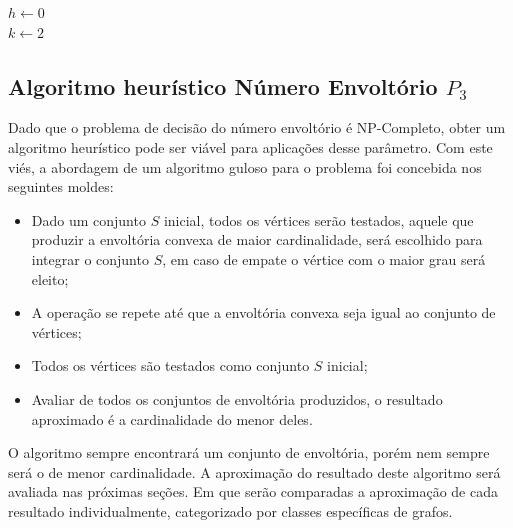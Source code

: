 
\begin{algorithm2e}
    \SetAlFnt{\tiny}
    \SetAlCapFnt{\small}
    \SetAlCapNameFnt{\small}
    \SetAlgoLined
    \DontPrintSemicolon
    \LinesNumbered
    \SetAlgoLined
    \BlankLine
    \BlankLine
    $h \gets 0$\\
    $k \gets 2$\\
\caption{$NumeroEnvoltorio(G(V,E))$}
\label{alg:numero-envoltoria-p3}
\end{algorithm2e}

\subsection{Algoritmo heurístico Número Envoltório $P_3$}

Dado que o problema de decisão do número envoltório é NP-Completo,
obter um algoritmo heurístico pode ser viável para aplicações desse parâmetro.
Com este viés, a abordagem de um algoritmo guloso para o problema foi concebida 
nos seguintes moldes: 
\begin{itemize}
    \item{Dado um conjunto $S$ inicial, todos os vértices serão testados,
    aquele que produzir a envoltória convexa de maior cardinalidade,
    será escolhido para integrar o conjunto $S$, 
    em caso de empate o vértice com o maior grau será eleito;}
    \item{A operação se repete até que a envoltória convexa seja igual ao conjunto de vértices;}
    \item{Todos os vértices são testados como conjunto $S$ inicial;} 
    \item{Avaliar de todos os conjuntos de envoltória produzidos, 
      o resultado aproximado é a cardinalidade do menor deles.}
\end{itemize}

O algoritmo sempre encontrará um conjunto de envoltória,
porém nem sempre será o de menor cardinalidade.
A aproximação do resultado deste algoritmo será avaliada nas próximas seções.
Em que serão comparadas a aproximação de cada resultado individualmente,
categorizado por classes específicas de grafos. 


